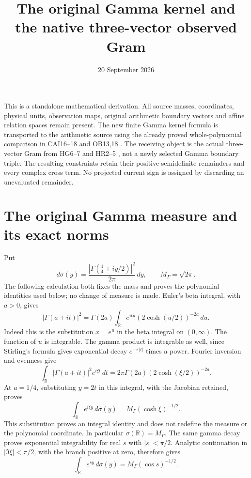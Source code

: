 \documentclass[11pt]{article}
\title{The original Gamma kernel and the native three-vector observed Gram}
\author{}
\date{20 September 2026}
\newcommand{\R}{\mathbb R}
\begin{document}
\maketitle

This is a standalone mathematical derivation.  All source masses,
coordinates, physical units, observation maps, original arithmetic boundary
vectors and affine relation spaces remain present.  The new finite Gamma
kernel formula is transported to the arithmetic source using the already
proved whole-polynomial comparison in CAI16--18 and OB13,18
\cite{CAI,OB}.  The receiving object is the actual three-vector Gram from
HG6--7 and HR2--5 \cite{HG,HR}, not a newly selected Gamma boundary triple.
The resulting constraints retain their positive-semidefinite remainders
and every complex cross term.  No projected current sign is assigned by
discarding an unevaluated remainder.

\section{The original Gamma measure and its exact norms}

Put
\begin{equation}\label{eq:sigma}
 d\sigma(y)=\frac{|\Gamma(\tfrac14+iy/2)|^2}{2\pi}\,dy,
 \qquad M_\Gamma=\sqrt{2\pi}.
\end{equation}
The following calculation both fixes the mass and proves the polynomial
identities used below; no change of measure is made.
Euler's beta integral, with $a>0$, gives
\[
 |\Gamma(a+it)|^2
 =\Gamma(2a)\int_{\R}e^{itu}(2\cosh(u/2))^{-2a}\,du.
\]
Indeed this is the substitution $x=e^u$ in the beta integral on
$(0,\infty)$.  The function of $u$ is integrable.  The gamma product is
integrable as well, since Stirling's formula gives exponential decay
$e^{-\pi|t|}$ times a power.  Fourier inversion and evenness give
\[
 \int_{\R}|\Gamma(a+it)|^2e^{i\xi t}\,dt
 =2\pi\Gamma(2a)(2\cosh(\xi/2))^{-2a}.
\]
At $a=1/4$, substituting $y=2t$ in this integral, with the Jacobian
retained, proves
\begin{equation}\label{eq:transform}
 \int_{\R}e^{i\xi y}\,d\sigma(y)
 =M_\Gamma(\cosh\xi)^{-1/2}.
\end{equation}
This substitution proves an integral identity and does not redefine the
measure or the polynomial coordinate.  In particular
$\sigma(\R)=M_\Gamma$.  The same gamma decay proves exponential
integrability for real $s$ with $|s|<\pi/2$.  Analytic continuation in
$|\Im\xi|<\pi/2$, with the branch positive at zero, therefore gives
\begin{equation}\label{eq:laplace}
 \int_{\R}e^{sy}\,d\sigma(y)=M_\Gamma(\cos s)^{-1/2}.
\end{equation}
\end{document}
